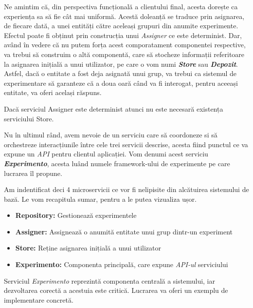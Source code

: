 Ne amintim că, din perspectiva funcțională a clientului final, acesta dorește ca experiența sa să fie cât mai uniformă. Acestă doleanță se traduce prin asignarea, de fiecare dată, a unei entități către aceleași grupuri din anumite experimente. Efectul poate fi obținut prin construcția unui \textit{Assigner} ce este determinist. Dar, având în vedere că nu putem forța acest comporatament componentei respective, va trebui să construim o altă componentă, care să stocheze informații referitoare la asignarea inițială a unui utilizator, pe care o vom numi \textit{\textbf{Store}} sau \textbf{\textit{Depozit}}. Astfel, dacă o entitate a fost deja asignată unui grup, va trebui ca sistemul de experimentare să garanteze că a doua oară când va fi interogat, pentru aceeași entitate, va oferi același răspuns.

\begin{remark}
	Dacă serviciul Assigner este determinist atunci nu este necesară existența serviciului Store. 
\end{remark}

Nu în ultimul rând, avem nevoie de un serviciu care să coordoneze si să orchestreze interacțiunile între cele trei servicii descrise, acesta fiind punctul ce va expune un \textit{API} pentru clientul aplicației. Vom denumi acest serviciu \textit{\textbf{Experimento}}, acesta luând numele framework-ului de experimente pe care lucrarea îl propune. 

Am indentificat deci 4 microservicii ce vor fi nelipisite din alcătuirea sistemului de bază. Le vom recapitula sumar, pentru a le putea vizualiza ușor.

\begin{itemize}
	\item \textbf{Repository:} Gestionează experimentele
	\item \textbf{Assigner:} Assignează o anumită entitate unui grup dintr-un experiment
	\item \textbf{Store:} Reține asignarea inițială a unui utilizator
	\item \textbf{Experimento:} Componenta principală, care expune \textit{API-ul} serviciului 
\end{itemize}

\begin{remark}
	Serviciul \textit{Experimento} reprezintă componenta centrală a sistemului, iar dezvoltarea corectă a acestuia este critică. Lucrarea va oferi un exemplu de implementare concretă.
\end{remark}



